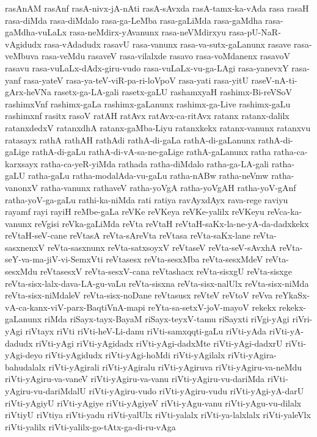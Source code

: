 {rasAnAM
rasAnf
rasA-nivx-jA-nAti
rasA-sAvxda
rasA-tamx-ka-vAda
rasa
rasaH
rasa-diMda
rasa-diMdalo
rasa-ga-LeMba
rasa-gaLiMda
rasa-gaMdha
rasa-gaMdha-vuLaLx
rasa-neMdirx-yAvanunx
rasa-neVMdirxyu
rasa-pU-NaR-vAgidudx
rasa-vAdadudx
rasavU
rasa-vanunx
rasa-va-sutx-gaLanunx
rasave
rasa-veMbuva
rasa-veMdu
rasaveV
rasa-vilalxde
rasavo
rasa-voMdanenx
rasavoV
rasavu
rasa-vuLaLx-dAdx-giru-vudo
rasa-vuLaLx-vu-ga-LAgi
rasa-yanevxY
rasa-yanf
rasa-yateV
rasa-ya-teV-viR-pa-ri-loVpoV
rasa-yati
rasa-yitU
raseV-nA-ti-gArx-heVNa
rasetx-ga-LA-gali
rasetx-gaLU
rashamxyaH
rashimx-Bi-reVSoV
rashimxVnf
rashimx-gaLa
rashimx-gaLanunx
rashimx-ga-Live
rashimx-gaLu
rashimxnf
rasitx
rasoV
ratAH
ratAvx
ratAvx-ca-ritAvx
ratanx
ratanx-dalilx
ratanxdedxV
ratanxdhA
ratanx-gaMba-Liyu
ratanxkekx
ratanx-vanunx
ratanxvu
ratasayx
rathA
rathAH
rathAdi
rathA-di-gaLa
rathA-di-gaLanunx
rathA-di-gaLige
rathA-di-gaLu
rathA-di-vA-sa-ne-gaLige
rathA-gaLanunx
ratha
ratha-ca-karxsayx
ratha-ca-yeR-yiMda
rathada
ratha-diMdalo
ratha-ga-LA-gali
ratha-gaLU
ratha-gaLu
ratha-modalAda-vu-gaLu
ratha-nABw
ratha-neVmw
ratha-vanonxV
ratha-vanunx
rathaveV
ratha-yoVgA
ratha-yoVgAH
ratha-yoV-gAnf
ratha-yoV-ga-gaLu
rathi-ka-niMda
rati
ratiya
ravAyxdAyx
rava-rege
raviyu
rayamf
rayi
rayiH
reMbe-gaLa
reVKe
reVKeya
reVKe-yalilx
reVKeyu
reVca-ka-vanunx
reVgisi
reVka-gaLiMda
reVta
reVtaH
reVtaH-saKx-la-ne-yA-da-dadxkekx
reVtaH-seV-cane
reVtasA
reVta-sAreVta
reVtasa
reVta-saKx-lane
reVta-sasxnenxV
reVta-sasxnunx
reVta-satxsoyxV
reVtaseV
reVta-seV-sAvxhA
reVta-seY-va-ma-jiV-vi-SemxVti
reVtasesx
reVta-sesxMba
reVta-sesxMdeV
reVta-sesxMdu
reVtasesxV
reVta-sesxV-cana
reVtashacx
reVta-sisxgU
reVta-sisxge
reVta-sisx-lalx-dava-LA-gu-vaLu
reVta-sisxna
reVta-sisx-nalUlx
reVta-sisx-niMda
reVta-sisx-niMdaleV
reVta-sisx-noDane
reVtasusx
reVteV
reVtoV
reVva
reYkaSx-vA-ca-kanx-viV-parx-BaqtiVnA-mapi
reYta-sa-setxV-joV-mayoV
rekekx
rekekx-gaLanunx
riMda
riSayx-tayx-BayaM
riSayx-teyxV-tamu
riSayxti
riVgi-yAgi
riVri-yAgi
riVtayx
riVti
riVti-heV-Li-danu
riVti-samxqqti-gaLu
riVti-yAda
riVti-yA-dadudx
riVti-yAgi
riVti-yAgidadx
riVti-yAgi-dadxMte
riVti-yAgi-dadxrU
riVti-yAgi-deyo
riVti-yAgidudx
riVti-yAgi-hoMdi
riVti-yAgilalx
riVti-yAgira-bahudalalx
riVti-yAgirali
riVti-yAgiralu
riVti-yAgiruva
riVti-yAgiru-va-neMdu
riVti-yAgiru-va-vaneV
riVti-yAgiru-va-vanu
riVti-yAgiru-vu-dariMda
riVti-yAgiru-vu-dariMdalU
riVti-yAgiru-vudo
riVti-yAgiru-vudu
riVti-yAgi-yA-darU
riVti-yAgiyU
riVti-yAgiye
riVti-yAgiyeV
riVti-yAgu-vanu
riVti-yAgu-vu-dilalx
riVtiyU
riVtiya
riVti-yadu
riVti-yalUlx
riVti-yalalx
riVti-ya-lalxlalx
riVti-yaleVlx
riVti-yalilx
riVti-yalilx-go-tAtx-ga-di-ru-vAga
}
